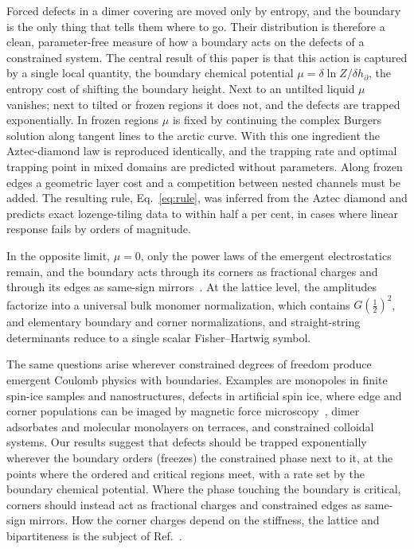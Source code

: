 \documentclass[aps,pre,twocolumn,superscriptaddress,nofootinbib,floatfix]{revtex4-2}
\begin{document}
Forced defects in a dimer covering are moved only by entropy, and the boundary is the only thing that tells them where to go. Their distribution is therefore a clean, parameter-free measure of how a boundary acts on the defects of a constrained system. The central result of this paper is that this action is captured by a single local quantity, the boundary chemical potential $\mu=\delta\ln Z/\delta h_\partial$, the entropy cost of shifting the boundary height. Next to an untilted liquid $\mu$ vanishes; next to tilted or frozen regions it does not, and the defects are trapped exponentially. In frozen regions $\mu$ is fixed by continuing the complex Burgers solution along tangent lines to the arctic curve. With this one ingredient the Aztec-diamond law is reproduced identically, and the trapping rate and optimal trapping point in mixed domains are predicted without parameters. Along frozen edges a geometric layer cost and a competition between nested channels must be added. The resulting rule, Eq.~\eqref{eq:rule}, was inferred from the Aztec diamond and predicts exact lozenge-tiling data to within half a per cent, in cases where linear response fails by orders of magnitude.

In the opposite limit, $\mu=0$, only the power laws of the emergent electrostatics remain, and the boundary acts through its corners as fractional charges and through its edges as same-sign mirrors~\cite{PaperII}. At the lattice level, the amplitudes factorize into a universal bulk monomer normalization, which contains $G(\tfrac12)^2$, and elementary boundary and corner normalizations, and straight-string determinants reduce to a single scalar Fisher--Hartwig symbol.

The same questions arise wherever constrained degrees of freedom produce emergent Coulomb physics with boundaries. Examples are monopoles in finite spin-ice samples and nanostructures, defects in artificial spin ice, where edge and corner populations can be imaged by magnetic force microscopy~\cite{Wang2006,Ladak2010}, dimer adsorbates and molecular monolayers on terraces, and constrained colloidal systems. Our results suggest that defects should be trapped exponentially wherever the boundary orders (freezes) the constrained phase next to it, at the points where the ordered and critical regions meet, with a rate set by the boundary chemical potential. Where the phase touching the boundary is critical, corners should instead act as fractional charges and constrained edges as same-sign mirrors. How the corner charges depend on the stiffness, the lattice and bipartiteness is the subject of Ref.~\cite{PaperII}.
\end{document}
